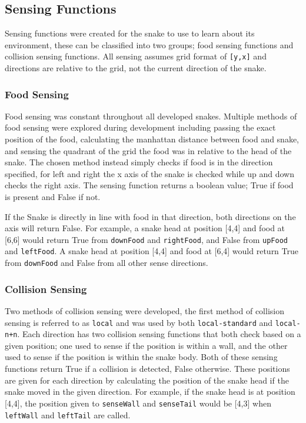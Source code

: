 \subsection{Sensing Functions}
Sensing functions were created for the snake to use to learn about its environment, these can be classified into two groups; food sensing functions and collision sensing functions. All sensing assumes grid format of \verb|[y,x]| and directions are relative to the grid, not the current direction of the snake.

\subsubsection{Food Sensing}
Food sensing was constant throughout all developed snakes. Multiple methods of food sensing were explored during development including passing the exact position of the food, calculating the manhattan distance between food and snake, and sensing the quadrant of the grid the food was in relative to the head of the snake. The chosen method instead simply checks if food is in the direction specified, for left and right the x axis of the snake is checked while up and down checks the right axis. The sensing function returns a boolean value; True if food is present and False if not. 

If the Snake is directly in line with food in that direction, both directions on the axis will return False. For example, a snake head at position [4,4] and food at [6,6] would return True from \verb|downFood| and \verb|rightFood|, and False from \verb|upFood| and \verb|leftFood|. A snake head at position [4,4] and food at [6,4] would return True from \verb|downFood| and False from all other sense directions.

\subsubsection{Collision Sensing}
Two methods of collision sensing were developed, the first method of collision sensing is referred to as \verb|local| and was used by both \verb|local-standard| and \verb|local-n+n|. Each direction has two collision sensing functions that both check based on a given position; one used to sense if the position is within a wall, and the other used to sense if the position is within the snake body. Both of these sensing functions return True if a collision is detected, False otherwise. These positions are given for each direction by calculating the position of the snake head if the snake moved in the given direction. For example, if the snake head is at position [4,4], the position given to \verb|senseWall| and \verb|senseTail| would be [4,3] when \verb|leftWall| and \verb|leftTail| are called. 

